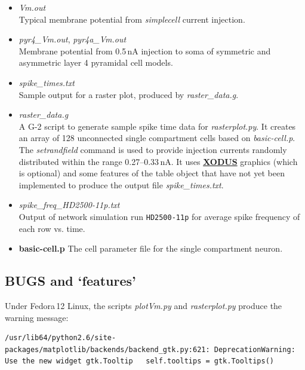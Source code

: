 \documentclass[12pt]{article}
\begin{document}
\begin{itemize}

\item {\it Vm.out}\\
Typical membrane potential from {\it simplecell} current injection.

\item {{\it pyr4\_Vm.out}, {\it pyr4a\_Vm.out}}\\
Membrane potential from 0.5\,nA injection to
soma of symmetric and asymmetric layer 4 pyramidal cell models.

\item {\it spike\_times.txt}\\
Sample output for a raster plot, produced by {\it raster\_data.g}.

\item{\it raster\_data.g}\\
A G-2 script to generate sample spike time data for
{\it rasterplot.py}. It creates an array of 128 unconnected single compartment
cells based on {\it basic-cell.p}.  The {\it setrandfield} command is used to provide
injection currents randomly distributed within the range 0.27--0.33\,nA.  It uses \href{http://www.genesis-sim.org/GENESIS/Hyperdoc/Manual-19.html}{\bf XODUS}
graphics (which is optional) and some features of the table object
that have not yet been implemented to produce the output file {\it spike\_times.txt}.

\item{\it spike\_freq\_HD2500-11p.txt}\\
Output of network simulation run {\tt HD2500-11p}
    for average spike frequency of each row vs. time.

\item{\bf basic-cell.p} The cell parameter file for the single compartment neuron.

\end{itemize}

\subsection*{BUGS and `features'}

Under Fedora\,12 Linux, the scripts {\it plotVm.py} and {\it rasterplot.py} produce the
warning message:
\begin{verbatim}
/usr/lib64/python2.6/site-packages/matplotlib/backends/backend_gtk.py:621: DeprecationWarning: Use the new widget gtk.Tooltip   self.tooltips = gtk.Tooltips()
\end{verbatim}
\end{document}
